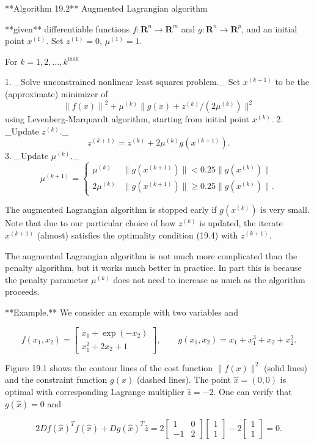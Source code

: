 

**Algorithm 19.2** Augmented Lagrangian algorithm

**given** differentiable functions \(f:\mathbf{R}^{n}\to\mathbf{R}^{m}\) and \(g:\mathbf{R}^{n}\to\mathbf{R}^{p}\), and an initial point \(x^{(1)}\). Set \(z^{(1)}=0\), \(\mu^{(1)}=1\).

For \(k=1,2,\ldots,k^{\max}\)

1. _Solve unconstrained nonlinear least squares problem._ Set \(x^{(k+1)}\) to be the (approximate) minimizer of \[\left\|f(x)\right\|^{2}+\mu^{(k)}\|g(x)+z^{(k)}/(2\mu^{(k)})\|^{2}\] using Levenberg-Marquardt algorithm, starting from initial point \(x^{(k)}\).
2. _Update \(z^{(k)}\)._ \[z^{(k+1)}=z^{(k)}+2\mu^{(k)}g(x^{(k+1)}).\]
3. _Update \(\mu^{(k)}\)._ \[\mu^{(k+1)}=\left\{\begin{array}{ll}\mu^{(k)}&\|g(x^{(k+1)})\|<0.25\|g(x^{(k )})\|\\ 2\mu^{(k)}&\|g(x^{(k+1)})\|\geq 0.25\|g(x^{(k)})\|.\end{array}\right.\]

The augmented Lagrangian algorithm is stopped early if \(g(x^{(k)})\) is very small. Note that due to our particular choice of how \(z^{(k)}\) is updated, the iterate \(x^{(k+1)}\) (almost) satisfies the optimality condition (19.4) with \(z^{(k+1)}\).

The augmented Lagrangian algorithm is not much more complicated than the penalty algorithm, but it works much better in practice. In part this is because the penalty parameter \(\mu^{(k)}\) does not need to increase as much as the algorithm proceeds.

**Example.** We consider an example with two variables and

\[f(x_{1},x_{2})=\left[\begin{array}{c}x_{1}+\exp(-x_{2})\\ x_{1}^{2}+2x_{2}+1\end{array}\right],\qquad g(x_{1},x_{2})=x_{1}+x_{1}^{3}+x_{ 2}+x_{2}^{2}.\]

Figure 19.1 shows the contour lines of the cost function \(\|f(x)\|^{2}\) (solid lines) and the constraint function \(g(x)\) (dashed lines). The point \(\hat{x}=(0,0)\) is optimal with corresponding Lagrange multiplier \(\hat{z}=-2\). One can verify that \(g(\hat{x})=0\) and

\[2Df(\hat{x})^{T}f(\hat{x})+Dg(\hat{x})^{T}\hat{z}=2\left[\begin{array}{cc} 1&0\\ -1&2\end{array}\right]\left[\begin{array}{c}1\\ 1\end{array}\right]-2\left[\begin{array}{c}1\\ 1\end{array}\right]=0.\]

